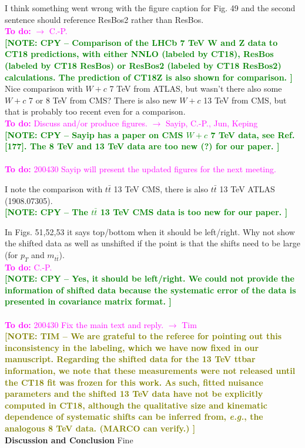 \documentclass[aps,prd,amsmath,nofootinbib,floatfix,fleqn]{revtex4}
\newcommand{\TODO}[1]{\textcolor{magenta}{
\quad\vspace{3pt} \\ {\bf To do:} #1 \\
}}
\newcommand{\NOTECPY}[1]{\textcolor{green}{ \bf[NOTE: CPY -- #1 ]}}
\newcommand{\NOTETIM}[1]{\textcolor{olive}{ \bf[NOTE: TIM -- #1 ]}}
\begin{document}
\noindent
I think something went wrong with the figure caption for Fig. 49 and the second sentence should
reference ResBos2 rather than ResBos.  
\TODO{$\to$ C.-P.}
\NOTECPY{Comparison of the LHCb 7 TeV W and Z data to CT18 predictions, with either NNLO (labeled by CT18), ResBos (labeled by CT18 ResBos) or ResBos2 (labeled by CT18 ResBos2) calculations. The prediction of CT18Z is also shown for comparison.}\\

\noindent
Nice comparison with $W+c$ 7 TeV from ATLAS, but wasn’t there also some $W+c$ 7 or 8 TeV from
CMS? There is also new $W+c$ 13 TeV from CMS, but that is probably too recent even for a comparison.
\TODO{Discuss and/or produce figures. $\to$ Sayip, C.-P., Jun, Keping}
\NOTECPY{Sayip has a paper on CMS $W+c$ 7 TeV data, see Ref. [177]. 
The 8 TeV and 13 TeV data are too new (?)  for our paper.}\\
\TODO{200430 Sayip will present the updated figures for the next meeting.}


\noindent

I note the comparison with $t\bar t$ 13 TeV CMS, there is also $t\bar t$ 13 TeV ATLAS (1908.07305). \\ 
\NOTECPY{The $t\bar t$ 13 TeV CMS data is too new for our paper.}\\

\noindent

In Figs. 51,52,53 it says top/bottom when it should be left/right. Why not show the shifted data as well as unshifted if the point is that the shifts need to be large (for $p_T$ and $m_{t\bar t}$).  
\TODO{C.-P.}
\NOTECPY{Yes, it should be left/right. We could not provide the information of shifted data because the systematic error of the data is presented in covariance matrix format. }\\
\TODO{200430 Fix the main text and reply. $\to$ Tim}
\NOTETIM{We are grateful to the referee for pointing out this inconsistency in the labeling,
which we have now fixed in our manuscript.  Regarding the shifted data for the 13 TeV ttbar
information, we note that these measurements were not released until the CT18 fit was frozen
for this work.  As such, fitted nuisance parameters and the shifted 13 TeV data have not be
explicitly computed in CT18, although the qualitative size and kinematic dependence of
systematic shifts can be inferred from, {\it e.g.}, the analogous 8 TeV data. ({\bf MARCO
can verify.})}\\

{\bf Discussion and Conclusion}
Fine\\
\end{document}
